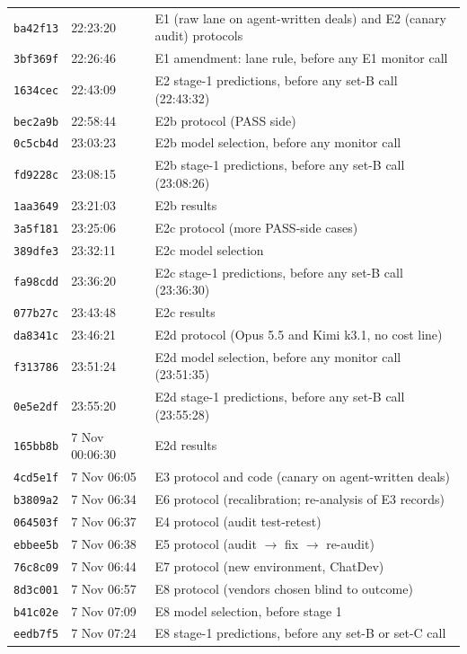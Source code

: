 \documentclass[11pt]{article}
\begin{document}
\begin{center}
\begin{tabularx}{\linewidth}{llX}
\midrule
\texttt{ba42f13} & 22:23:20 & E1 (raw lane on agent-written deals) and E2 (canary audit) protocols \\
\texttt{3bf369f} & 22:26:46 & E1 amendment: lane rule, before any E1 monitor call \\
\texttt{1634cec} & 22:43:09 & E2 stage-1 predictions, before any set-B call (22:43:32) \\
\texttt{bec2a9b} & 22:58:44 & E2b protocol (PASS side) \\
\texttt{0c5cb4d} & 23:03:23 & E2b model selection, before any monitor call \\
\texttt{fd9228c} & 23:08:15 & E2b stage-1 predictions, before any set-B call (23:08:26) \\
\texttt{1aa3649} & 23:21:03 & E2b results \\
\texttt{3a5f181} & 23:25:06 & E2c protocol (more PASS-side cases) \\
\texttt{389dfe3} & 23:32:11 & E2c model selection \\
\texttt{fa98cdd} & 23:36:20 & E2c stage-1 predictions, before any set-B call (23:36:30) \\
\texttt{077b27c} & 23:43:48 & E2c results \\
\texttt{da8341c} & 23:46:21 & E2d protocol (Opus 5.5 and Kimi k3.1, no cost line) \\
\texttt{f313786} & 23:51:24 & E2d model selection, before any monitor call (23:51:35) \\
\texttt{0e5e2df} & 23:55:20 & E2d stage-1 predictions, before any set-B call (23:55:28) \\
\texttt{165bb8b} & 7 Nov 00:06:30 & E2d results \\
\texttt{4cd5e1f} & 7 Nov 06:05 & E3 protocol and code (canary on agent-written deals) \\
\texttt{b3809a2} & 7 Nov 06:34 & E6 protocol (recalibration; re-analysis of E3 records) \\
\texttt{064503f} & 7 Nov 06:37 & E4 protocol (audit test-retest) \\
\texttt{ebbee5b} & 7 Nov 06:38 & E5 protocol (audit $\to$ fix $\to$ re-audit) \\
\texttt{76c8c09} & 7 Nov 06:44 & E7 protocol (new environment, ChatDev) \\
\texttt{8d3c001} & 7 Nov 06:57 & E8 protocol (vendors chosen blind to outcome) \\
\texttt{b41c02e} & 7 Nov 07:09 & E8 model selection, before stage 1 \\
\texttt{eedb7f5} & 7 Nov 07:24 & E8 stage-1 predictions, before any set-B or set-C call \\

\end{tabularx}
\end{center}
\end{document}
